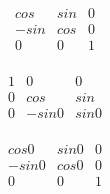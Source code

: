 \documentclass[12pt,a4paper]{article}
\begin{document}
\[\begin{array}{crl}
cos      &sin        &0  \\  
-sin     &cos        &0  \\
0        &0          &1  \\
\end{array}\]


\[\begin{array}{crl}
1      &0        &0  \\  
0     &cos        &sin  \\
0        &-sin0          &sin0  \\
\end{array}\]

\[\begin{array}{crl}
cos0      &sin0        &0  \\  
-sin0     &cos0        &0  \\
0        &0          &1  \\
\end{array}\]
\end{document}
